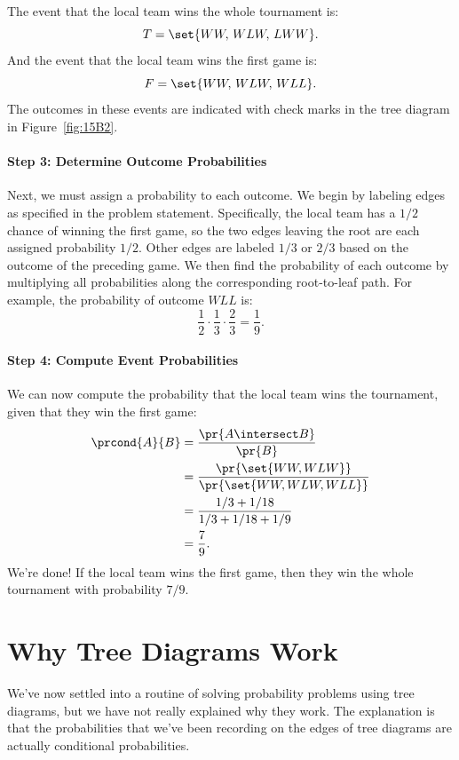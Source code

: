 The event that the local team wins the whole tournament is:
%
\[
    T = \set{WW,\, WLW,\, LWW}.
\]
%
And the event that the local team wins the first game is:
%
\[
    F = \set{WW,\, WLW,\, WLL }.
\]
%
The outcomes in these events are indicated with check marks in the tree
diagram in Figure~\ref{fig:15B2}.

\paragraph{Step 3:  Determine Outcome Probabilities}

Next, we must assign a probability to each outcome.  We begin by
labeling edges as specified in the problem statement.  Specifically,
the local team has a $1/2$ chance of winning the first game, so
the two edges leaving the root are each assigned probability $1/2$.
Other edges are labeled $1/3$ or $2/3$ based on the outcome of the
preceding game.  We then find the probability of each outcome by
multiplying all probabilities along the corresponding root-to-leaf
path.  For example, the probability of outcome $WLL$ is:
%
\[
    \frac{1}{2} \cdot \frac{1}{3} \cdot \frac{2}{3} = \frac{1}{9}.
\]

\paragraph{Step 4: Compute Event Probabilities}

We can now compute the probability that the local team wins the
tournament, given that they win the first game:
%
\begingroup
{}
\begin{align*}
\prcond{A}{B}
    & = \frac{\pr{A \intersect B}}{\pr{B}} \\
    & = \frac{\pr{\set{WW, WLW}}}{\pr{\set{WW, WLW, WLL}}} \\
    & = \frac{1/3 + 1/18}{1/3 + 1/18 + 1/9} \\
    & = \frac{7}{9}.
\end{align*}
\endgroup
%
We're done!  If the local team wins the first game, then they win
the whole tournament with probability $7 / 9$.

\section{Why Tree Diagrams Work}\label{product_rule_subsec}

We've now settled into a routine of solving probability problems using
tree diagrams, but we have not really explained why they work.  The
explanation is that the probabilities that we've been recording on the
edges of tree diagrams are actually conditional probabilities.  


